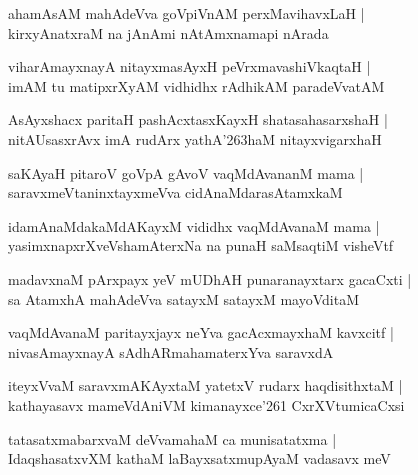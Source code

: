 \documentclass[twoside,12pt,openright]{book}
\def\S{\char'263}
\newcounter{shloka}[chapter]
\begin{document}
\begin{shloka}%
ahamAsAM mahAdeVva goVpiVnAM perxMavihavxLaH |\\
kirxyAnatxraM na jAnAmi nAtAmxnamapi nArada 
\end{shloka}

\begin{shloka}%
viharAmayxnayA nitayxmasAyxH peVrxmavashiVkaqtaH |\\
imAM tu matipxrXyAM vidhidhx rAdhikAM paradeVvatAM 
\end{shloka}

\begin{shloka}%
AsAyxshacx paritaH pashAcxtasxKayxH shatasahasarxshaH |\\
nitAUsasxrAvx imA rudArx yathA\S haM nitayxvigarxhaH
\end{shloka}

\begin{shloka}%
saKAyaH pitaroV goVpA gAvoV vaqMdAvananM mama |\\
saravxmeVtaninxtayxmeVva cidAnaMdarasAtamxkaM 
\end{shloka}

\begin{shloka}%
idamAnaMdakaMdAKayxM vididhx vaqMdAvanaM mama |\\
yasimxnapxrXveVshamAterxNa na punaH saMsaqtiM visheVtf 
\end{shloka}

\begin{shloka}%
madavxnaM pArxpayx yeV mUDhAH punaranayxtarx gacaCxti |\\
sa AtamxhA mahAdeVva satayxM satayxM mayoVditaM 
\end{shloka}

\begin{shloka}%
vaqMdAvanaM paritayxjayx neYva gacAcxmayxhaM kavxcitf |\\
nivasAmayxnayA sAdhARmahamaterxYva saravxdA 
\end{shloka}

\begin{shloka}%
iteyxVvaM saravxmAKAyxtaM yatetxV rudarx haqdisithxtaM |\\
kathayasavx mameVdAniVM kimanayxce\char'261 CxrXVtumicaCxsi
\end{shloka}

\begin{shloka}%
tatasatxmabarxvaM deVvamahaM ca munisatatxma |\\
IdaqshasatxvXM kathaM laBayxsatxmupAyaM vadasavx meV 
\end{shloka}
\end{document}
